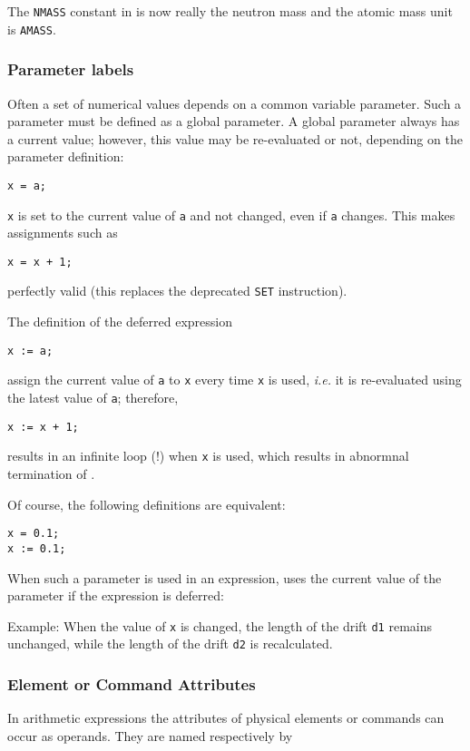 The \texttt{NMASS} constant in \madx is now really the neutron mass and the atomic mass
unit is \texttt{AMASS}.

\subsubsection{Parameter labels} 
Often a set of numerical values depends on a common variable
parameter. Such a parameter must be defined as a global parameter. A
global parameter always has a current value; however, this value may be
re-evaluated or not, depending on the parameter definition:  
\begin{verbatim}
x = a;
\end{verbatim} 
\texttt{x} is set to the current value of \texttt{a} and not changed,
even if \texttt{a} changes. This makes assignments such as  
\begin{verbatim}
x = x + 1;
\end{verbatim} 
perfectly valid (this replaces the deprecated \texttt{SET} instruction).

The definition of the deferred expression  
\begin{verbatim}
x := a;
\end{verbatim} 
assign the current value of \texttt{a} to \texttt{x} every time
\texttt{x} is used, \textsl{i.e.} it is re-evaluated using the latest
value of \texttt{a}; therefore,   
\begin{verbatim}
x := x + 1;
\end{verbatim} 
results in an infinite loop (!) when \texttt{x} is used, which results
in abnormnal termination of \madx. 

Of course, the following definitions are equivalent:  
\begin{verbatim}
x = 0.1;
x := 0.1;
\end{verbatim}

When such a parameter is used in an expression, \madx uses the current
value of the parameter if the expression is deferred:  

Example: 
When the value of \texttt{x} is changed, the length of the drift
\texttt{d1} remains unchanged, while the length of the drift \texttt{d2}
is recalculated.

\subsubsection{Element or Command Attributes} 
In arithmetic expressions the attributes of physical elements or
commands can occur as operands. They are named respectively by  

